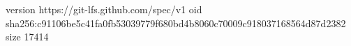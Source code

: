 version https://git-lfs.github.com/spec/v1
oid sha256:c91106be5c41fa0fb53039779f680bd4b8060c70009c918037168564d87d2382
size 17414
